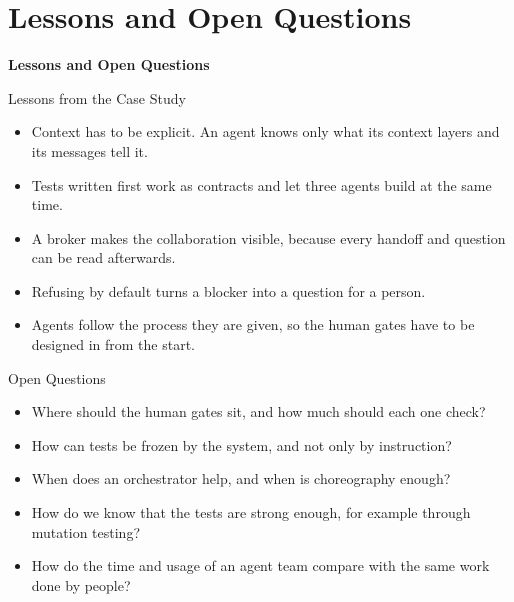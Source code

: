 \documentclass[aspectratio=169, table, 12pt]{beamer}
\begin{document}
\section{Lessons and Open Questions}

\begin{frame}{\hfill}
  \centering
  \Huge{\textbf{Lessons and Open Questions}}
\end{frame}

\begin{frame}{{\Large Lessons from the Case Study}}
  \vspace{6pt}
  \begin{itemize}
    \item Context has to be explicit. An agent knows only what its context
          layers and its messages tell it.
    \item Tests written first work as contracts and let three agents build at
          the same time.
    \item A broker makes the collaboration visible, because every handoff and
          question can be read afterwards.
    \item Refusing by default turns a blocker into a question for a person.
    \item Agents follow the process they are given, so the human gates have to
          be designed in from the start.
  \end{itemize}
\end{frame}

\begin{frame}{{\Large Open Questions}}
  \vspace{6pt}
  \begin{itemize}
    \item Where should the human gates sit, and how much should each one
          check?
    \item How can tests be frozen by the system, and not only by
          instruction?
    \item When does an orchestrator help, and when is choreography enough?
    \item How do we know that the tests are strong enough, for example through
          mutation testing?
    \item How do the time and usage of an agent team compare with the same
          work done by people?
  \end{itemize}
\end{frame}

\end{document}
